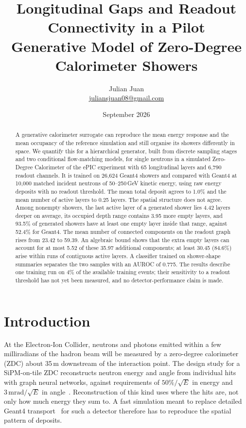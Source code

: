 \documentclass[11pt]{article}
\title{Longitudinal Gaps and Readout Connectivity in a Pilot\\Generative Model of Zero-Degree Calorimeter Showers}
\author{Julian Juan\\[3pt]\small\href{mailto:juliansjuan08@gmail.com}{juliansjuan08@gmail.com}}
\date{September 2026}
\begin{document}
\maketitle

\begin{abstract}
A generative calorimeter surrogate can reproduce the mean energy response and the mean occupancy of the reference simulation and still organise its showers differently in space. We quantify this for a hierarchical generator, built from discrete sampling stages and two conditional flow-matching models, for single neutrons in a simulated Zero-Degree Calorimeter of the ePIC experiment with 65 longitudinal layers and 6,790 readout channels. It is trained on 26,624 Geant4 showers and compared with Geant4 at 10,000 matched incident neutrons of 50--250\,GeV kinetic energy, using raw energy deposits with no readout threshold. The mean total deposit agrees to 1.0\% and the mean number of active layers to 0.25 layers. The spatial structure does not agree. Among nonempty showers, the last active layer of a generated shower lies 4.42 layers deeper on average, its occupied depth range contains 3.95 more empty layers, and 93.5\% of generated showers have at least one empty layer inside that range, against 52.4\% for Geant4. The mean number of connected components on the readout graph rises from 23.42 to 59.39. An algebraic bound shows that the extra empty layers can account for at most 5.52 of these 35.97 additional components; at least 30.45 (84.6\%) arise within runs of contiguous active layers. A classifier trained on shower-shape summaries separates the two samples with an AUROC of 0.775. The results describe one training run on 4\% of the available training events; their sensitivity to a readout threshold has not yet been measured, and no detector-performance claim is made.
\end{abstract}

\section{Introduction}

At the Electron-Ion Collider, neutrons and photons emitted within a few milliradians of the hadron beam will be measured by a zero-degree calorimeter (ZDC) about 35\,m downstream of the interaction point. The design study for a SiPM-on-tile ZDC reconstructs neutron energy and angle from individual hits with graph neural networks, against requirements of $50\%/\sqrt{E}$ in energy and $3\,\mathrm{mrad}/\sqrt{E}$ in angle~\cite{epiczdc}. Reconstruction of this kind uses where the hits are, not only how much energy they sum to. A fast simulation meant to replace detailed Geant4 transport~\cite{geant4} for such a detector therefore has to reproduce the spatial pattern of deposits.
\end{document}
